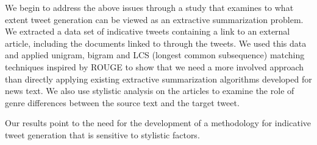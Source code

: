 
We begin to address the above issues through a study that examines to what extent tweet generation can be viewed as an extractive summarization problem. We extracted a data set of indicative tweets containing a link to an external article, including the documents linked to through the tweets. We used this data and applied unigram, bigram and LCS (longest common subsequence) matching techniques inspired by ROUGE to show that we need a more involved approach than directly applying existing extractive summarization algorithms developed for news text. We also use stylistic analysis on the articles to examine the role of genre differences between the source text and the target tweet.

Our results point to the need for the development of a methodology for indicative tweet generation that is sensitive to stylistic factors. 

